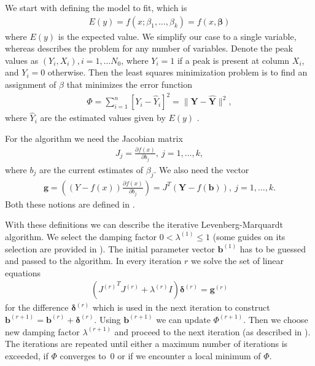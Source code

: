 We start with defining the model to fit, which is 
\begin{align}
E(y) = f(x; \beta_1, \ldots, \beta_k) = f(x, \boldsymbol\beta)
\end{align}
where $E(y)$ is the expected value. We simplify our case to a single variable, whereas \citep[p.~431]{Marquardt1963} describes the problem for any number of variables. Denote the peak values as $(Y_i, X_i), i = 1, \ldots N_0$, where $Y_i = 1$ if a peak is present at column $X_i$, and $Y_i = 0$ otherwise. Then the least squares minimization problem is to find an assignment of $\beta$ that minimizes the error function 
\begin{align}
\Phi = \sum\limits_{i=1}^n[Y_i-\hat{Y}_i]^2 = \|\boldsymbol Y-\hat{\boldsymbol Y}\|^2,
\end{align}
where $\hat{Y}_i$ are the estimated values given by $E(y)$ \citep[p.~431]{Marquardt1963}.

For the algorithm we need the Jacobian matrix 
\begin{align}
J_j = \frac{\partial f(x)}{\partial b_j},\ j = 1, \ldots, k, 
\end{align}
where $b_j$ are the current estimates of $\beta_j$. We also need the vector
\begin{align}
\boldsymbol g = \left( (Y - f(x)) \frac{\partial f(x)}{\partial b_j}\right) = J^T(\boldsymbol Y - f(\boldsymbol b)),\ j = 1, \ldots, k.
\end{align}
Both these notions are defined in \citep[p.~433]{Marquardt1963}.

With these definitions we can describe the iterative Levenberg-Marquardt algorithm. We select the damping factor $0 < \lambda^{(1)} \leq 1$ (some guides on its selection are provided in \citep[p.~437]{Marquardt1963}). The initial parameter vector $\boldsymbol b^{(1)}$ has to be guessed and passed to the algorithm. In every iteration $r$ we solve the set of linear equations
\begin{align}
({J^{(r)}}^T J^{(r)} + \lambda^{(r)}I)\boldsymbol \delta^{(r)} = \boldsymbol g^{(r)}
\end{align}
for the difference $\boldsymbol \delta^{(r)}$ which is used in the next iteration to construct $\boldsymbol b^{(r+1)} = \boldsymbol b^{(r)} + \boldsymbol \delta^{(r)}$. Using $\boldsymbol b^{(r+1)}$ we can update $\Phi^{(r+1)}$. Then we choose new damping factor $\lambda^{(r+1)}$ and proceed to the next iteration (as described in \citep[pp.~437--428]{Marquardt1963}). The iterations are repeated until either a maximum number of iterations is exceeded, if $\Phi$ converges to~0 or if we encounter a local minimum of $\Phi$. 

